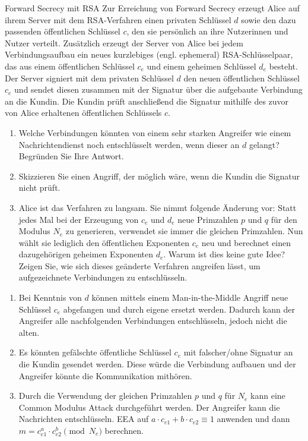 \documentclass{article}
\begin{document}
\begin{exercise}{Forward Secrecy mit RSA}
  Zur Erreichung von Forward Secrecy erzeugt Alice auf ihrem Server mit dem RSA-Verfahren einen privaten Schlüssel $d$ sowie den dazu passenden öffentlichen Schlüssel $c$, den sie persönlich an ihre Nutzerinnen und Nutzer verteilt. Zusätzlich erzeugt der Server von Alice bei jedem Verbindungsaufbau ein neues kurzlebiges (engl. ephemeral) RSA-Schlüsselpaar, das aus einem öffentlichen Schlüssel $ c_e $ und einem geheimen Schlüssel $ d_e $ besteht. Der Server signiert mit dem privaten Schlüssel $ d $ den neuen öffentlichen Schlüssel $ c_e $ und sendet diesen zusammen mit der Signatur über die aufgebaute Verbindung an die Kundin. Die Kundin prüft anschließend die Signatur mithilfe des zuvor von Alice erhaltenen öffentlichen Schlüssels $ c $.
  \begin{enumerate}
    \item Welche Verbindungen könnten von einem sehr starken Angreifer wie einem Nachrichtendienst noch entschlüsselt werden, wenn dieser an $d$ gelangt? Begründen Sie Ihre Antwort.
    \item Skizzieren Sie einen Angriff, der möglich wäre, wenn die Kundin die Signatur nicht prüft.
    \item Alice ist das Verfahren zu langsam. Sie nimmt folgende Änderung vor: Statt jedes Mal bei der Erzeugung von $c_e$ und $d_e$ neue Primzahlen $p$ und $q$ für den Modulus $N_e$ zu generieren, verwendet sie immer die gleichen Primzahlen. Nun wählt sie lediglich den öffentlichen Exponenten $ c_e $ neu und berechnet einen dazugehörigen geheimen Exponenten $ d_e $. Warum ist dies keine gute Idee? Zeigen Sie, wie sich dieses geänderte Verfahren angreifen lässt, um aufgezeichnete Verbindungen zu entschlüsseln.
  \end{enumerate}

  \begin{solution}
    \begin{enumerate}
      \item Bei Kenntnis von $d$ können mittels einem Man-in-the-Middle Angriff neue Schlüssel $c_e$ abgefangen und durch eigene ersetzt werden. Dadurch kann der Angreifer alle nachfolgenden Verbindungen entschlüsseln, jedoch nicht die alten.
      \item Es könnten gefälschte öffentliche Schlüssel $c_e$ mit falscher/ohne Signatur an die Kundin gesendet werden. Diese würde die Verbindung aufbauen und der Angreifer könnte die Kommunikation mithören.
      \item Durch die Verwendung der gleichen Primzahlen $p$ und $q$ für $N_e$ kann eine Common Modulus Attack durchgeführt werden. Der Angreifer kann die Nachrichten entschlüsseln. EEA auf $a\cdot c_{e1}+b\cdot c_{e2} \equiv 1$ anwenden und dann $m=c_{e1}^a\cdot c_{e2}^b \pmod{N_e}$ berechnen.
    \end{enumerate}
  \end{solution}
\end{exercise}
\end{document}
